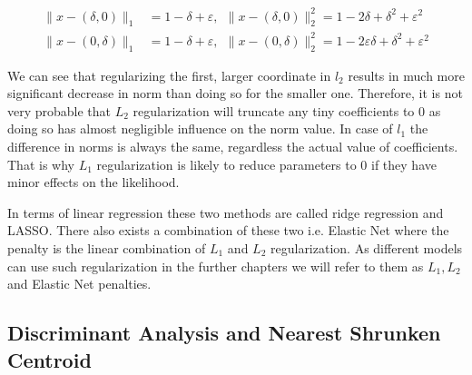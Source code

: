 \documentclass[shortabstract, english, mgr]{iithesis}
\begin{document}
\begin{align*}
    \|x-(\delta, 0)\|_{1}&=1-\delta+\varepsilon, \ \   \|x-(\delta, 0)\|_{2}^{2}=1-2 \delta+\delta^{2}+\varepsilon^{2} \\ 
    \|x-(0, \delta)\|_{1}&=1-\delta+\varepsilon, \ \  \|x-(0, \delta)\|_{2}^{2}=1-2 \varepsilon \delta+\delta^{2}+\varepsilon^{2}
\end{align*}

We can see that regularizing the first, larger coordinate in $l_2$ results in much more significant decrease in norm than doing so for the smaller one. Therefore, it is not very probable that $L_2$ regularization will truncate any tiny coefficients to $0$ as doing so has almost negligible influence on the norm value. In case of $l_1$ the difference in norms is always the same, regardless the actual value of coefficients. That is why $L_1$ regularization is likely to reduce parameters to $0$ if they have minor effects on the likelihood. 

In terms of linear regression these two methods are called ridge regression and LASSO. There also exists a combination of these two i.e. Elastic Net where the penalty is the linear combination of $L_1$ and $L_2$ regularization. As different models can use such regularization in the further chapters we will refer to them as $L_1, L_2$ and Elastic Net penalties.

\subsection{Discriminant Analysis and Nearest Shrunken Centroid}
\end{document}
